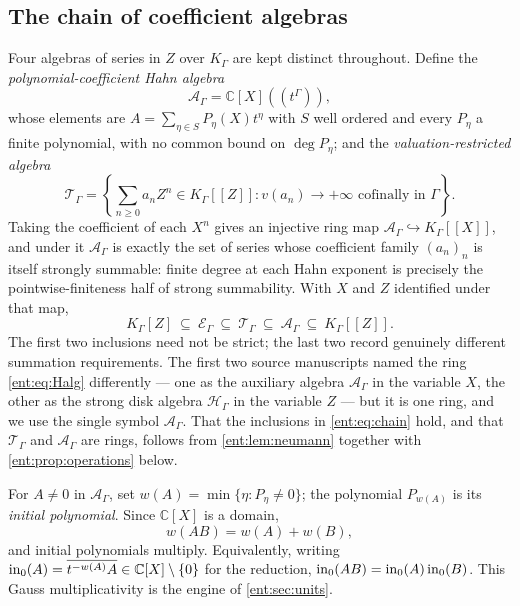 \documentclass[11pt]{article}
\theoremstyle{plain}
\theoremstyle{plain}
\theoremstyle{plain}
\theoremstyle{definition}
\theoremstyle{definition}
\theoremstyle{definition}
\theoremstyle{definition}
\theoremstyle{remark}
\newcommand{\C}{\mathbb C}\newcommand{\R}{\mathbb R}
\newcommand{\K}{K_\Gamma}\newcommand{\KD}{K_\Delta}
\newcommand{\E}{\mathcal E_\Gamma}
\newcommand{\A}{\mathcal A_\Gamma}\newcommand{\OO}{\mathcal O_\Gamma}
\newcommand{\TT}{\mathcal T_\Gamma}
\begin{document}
\subsection{The chain of coefficient algebras}
\label{ent:subsec:chain}
Four algebras of series in $Z$ over $\K$ are kept distinct throughout.
Define the \emph{polynomial-coefficient Hahn algebra}
\begin{equation}\label{ent:eq:Halg}
 \A=\C[X]((t^\Gamma)),
\end{equation}
whose elements are $A=\sum_{\eta\in S}P_\eta(X)t^\eta$ with $S$ well ordered
and every $P_\eta$ a finite polynomial, with no common bound on
$\deg P_\eta$; and the \emph{valuation-restricted algebra}
\begin{equation}\label{ent:eq:Talg}
 \TT=\left\{\sum_{n\ge0}a_nZ^n\in\K[[Z]]:
  v(a_n)\to+\infty\text{ cofinally in }\Gamma\right\}.
\end{equation}
Taking the coefficient of each $X^n$ gives an injective ring map
$\A\hookrightarrow\K[[X]]$, and under it $\A$ is exactly the set of series
whose coefficient family $(a_n)_n$ is itself strongly summable: finite degree
at each Hahn exponent is precisely the pointwise-finiteness half of strong
summability. With $X$ and $Z$ identified under that map,
\begin{equation}\label{ent:eq:chain}
 \K[Z]\ \subseteq\ \E\ \subseteq\ \TT\ \subseteq\ \A\ \subseteq\ \K[[Z]].
\end{equation}
The first two inclusions need not be strict; the last two record genuinely
different summation requirements. The first two source manuscripts named the ring
\eqref{ent:eq:Halg} differently --- one as the auxiliary algebra $\A$ in the
variable $X$, the other as the strong disk algebra $\mathcal H_\Gamma$ in the
variable $Z$ --- but it is one ring, and we use the single symbol $\A$. That
the inclusions in \eqref{ent:eq:chain} hold, and that $\TT$ and $\A$ are
rings, follows from \cref{ent:lem:neumann} together with
\cref{ent:prop:operations} below.

For $A\ne0$ in $\A$, set $w(A)=\min\{\eta:P_\eta\ne0\}$; the polynomial
$P_{w(A)}$ is its \emph{initial polynomial}. Since $\C[X]$ is a domain,
\begin{equation}\label{ent:eq:gauss-mult}
 w(AB)=w(A)+w(B),
\end{equation}
and initial polynomials multiply. Equivalently, writing
$\inpol_0(A)=\overline{t^{-w(A)}A}\in\C[X]\setminus\{0\}$ for the reduction,
$\operatorname{in}_0(AB)=\operatorname{in}_0(A)\operatorname{in}_0(B)$. This Gauss multiplicativity is the
engine of \cref{ent:sec:units}.
\end{document}
